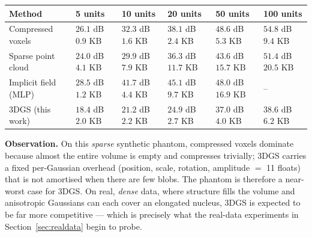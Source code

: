 \documentclass[11pt,a4paper]{article}
\begin{document}
\begin{table}[h!]
\centering
\scriptsize
\renewcommand{\arraystretch}{1.25}
\begin{tabularx}{\textwidth}{@{}p{}XXXXX@{}}
\toprule
\textbf{Method} & \textbf{5 units} & \textbf{10 units} & \textbf{20 units} & \textbf{50 units} & \textbf{100 units} \\
\midrule
Compressed voxels &
\makecell{\(26.1\) dB\\\(0.9\) KB} & \makecell{\(32.3\) dB\\\(1.6\) KB} &
\makecell{\(38.1\) dB\\\(2.4\) KB} & \makecell{\(48.6\) dB\\\(5.3\) KB} &
\makecell{\(54.8\) dB\\\(9.4\) KB} \\
Sparse point cloud &
\makecell{\(24.0\) dB\\\(4.1\) KB} & \makecell{\(29.9\) dB\\\(7.9\) KB} &
\makecell{\(36.3\) dB\\\(11.7\) KB} & \makecell{\(43.6\) dB\\\(15.7\) KB} &
\makecell{\(51.4\) dB\\\(20.5\) KB} \\
Implicit field (MLP) &
\makecell{\(28.5\) dB\\\(1.2\) KB} & \makecell{\(41.7\) dB\\\(4.4\) KB} &
\makecell{\(45.1\) dB\\\(9.7\) KB} & \makecell{\(48.0\) dB\\\(16.9\) KB} & -- \\
3DGS (this work) &
\makecell{\(18.4\) dB\\\(2.0\) KB} & \makecell{\(21.2\) dB\\\(2.2\) KB} &
\makecell{\(24.9\) dB\\\(2.7\) KB} & \makecell{\(37.0\) dB\\\(4.0\) KB} &
\makecell{\(38.6\) dB\\\(6.2\) KB} \\
\bottomrule
\end{tabularx}
\end{table}

\textbf{Observation.}
On this \emph{sparse} synthetic phantom, compressed voxels dominate because almost the
entire volume is empty and compresses trivially; 3DGS carries a fixed per-Gaussian
overhead (position, scale, rotation, amplitude $=$ 11 floats) that is not amortised when
there are few blobs. The phantom is therefore a near-worst case for 3DGS. On real,
\emph{dense} data, where structure fills the volume and anisotropic Gaussians can each
cover an elongated nucleus, 3DGS is expected to be far more competitive --- which is
precisely what the real-data experiments in Section~\ref{sec:realdata} begin to probe.
\end{document}
